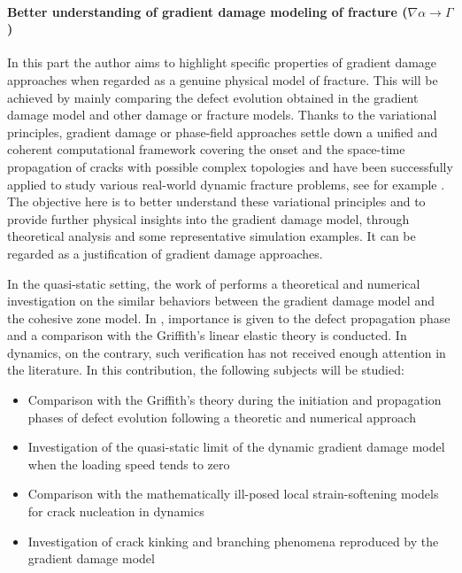 \paragraph{Better understanding of gradient damage modeling of fracture ($\nabla\alpha\to\Gamma$)} In this part the author aims to highlight specific properties of gradient damage approaches when regarded as a genuine physical model of fracture. This will be achieved by mainly comparing the defect evolution obtained in the gradient damage model and other damage or fracture models. Thanks to the variational principles, gradient damage or phase-field approaches settle down a unified and coherent computational framework covering the onset and the space-time propagation of cracks with possible complex topologies and have been successfully applied to study various real-world dynamic fracture problems, see for example \cite{HofackerMiehe:2012,BordenVerhooselScottHughesLandis:2012,SchlueterWillenbuecherKuhnMueller:2014,DallyWeinberg:2015}. The objective here is to better understand these variational principles and to provide further physical insights into the gradient damage model, through theoretical analysis and some representative simulation examples. It can be regarded as a justification of gradient damage approaches.

In the quasi-static setting, the work of \cite{LorentzCuvilliezKazymyrenko:2011,LorentzCuvilliezKazymyrenko:2012} performs a theoretical and numerical investigation on the similar behaviors between the gradient damage model and the cohesive zone model. In \cite{SicsicMarigo:2013,HossainHsuehBourdinBhattachary:2014,KlinsmannRosatoKamlahMcMeeking:2015}, importance is given to the defect propagation phase and a comparison with the Griffith's linear elastic theory is conducted. In dynamics, on the contrary, such verification has not received enough attention in the literature. In this contribution, the following subjects will be studied:
\begin{itemize}
\item Comparison with the Griffith's theory during the initiation and propagation phases of defect evolution following a theoretic and numerical approach

\item Investigation of the quasi-static limit of the dynamic gradient damage model when the loading speed tends to zero

\item Comparison with the mathematically ill-posed local strain-softening models for crack nucleation in dynamics

\item Investigation of crack kinking and branching phenomena reproduced by the gradient damage model
\end{itemize}


